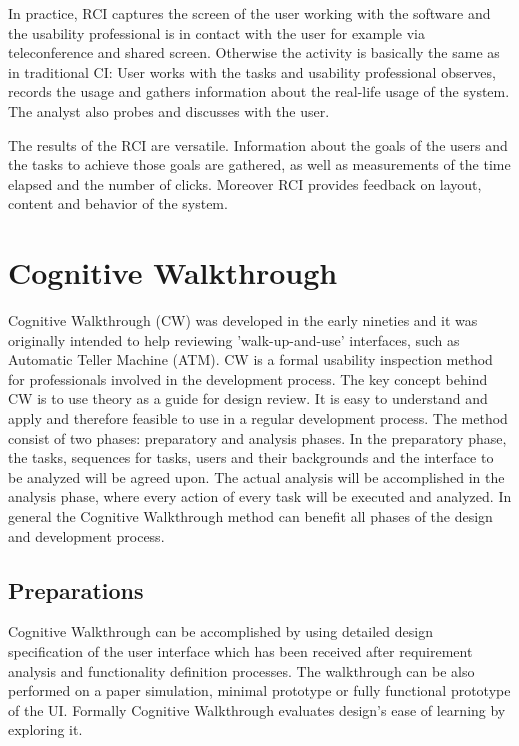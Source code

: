 \documentclass[12pt,a4paper,oneside,pdftex]{report}
\begin{document}
In practice, RCI captures the screen of the user working with the software and the usability professional is in contact with the user for example via teleconference and shared screen. Otherwise the activity is basically the same as in traditional CI: User works with the tasks and usability professional observes, records the usage and gathers information about the real-life usage of the system. The analyst also probes and discusses with the user. \cite{RefWorks:32}

The results of the RCI are versatile. Information about the goals of the users and the tasks to achieve those goals are gathered, as well as measurements of the time elapsed and the number of clicks. Moreover RCI provides feedback on layout, content and behavior of the system. \cite{RefWorks:32}
 
\section{Cognitive Walkthrough}
\label{sec:cognitivewalkthrough}

Cognitive Walkthrough (CW) was developed in the early nineties and it was originally intended to help reviewing 'walk-up-and-use' interfaces, such as Automatic Teller Machine (ATM). CW is a formal usability inspection method for professionals involved in the development process. The key concept behind CW is to use theory as a guide for design review. It is easy to understand and apply and therefore feasible to use in a regular development process. \cite{RefWorks:19, RefWorks:18} 
The method consist of two phases: preparatory and analysis phases. In the preparatory phase, the tasks, sequences for tasks, users and their backgrounds and the interface to be analyzed will be agreed upon.  The actual analysis will be accomplished in the analysis phase, where every action of every task will be executed and analyzed. In general the Cognitive Walkthrough method can benefit all phases of the design and development process.\cite{RefWorks:26}

\subsection{Preparations}
Cognitive Walkthrough can be accomplished by using detailed design specification of the user interface which has been received after requirement analysis and functionality definition processes. The walkthrough can be also performed  on a paper simulation, minimal prototype or fully functional prototype of the UI. Formally Cognitive Walkthrough evaluates design's ease of learning by exploring it. \cite{RefWorks:26}
\end{document}
